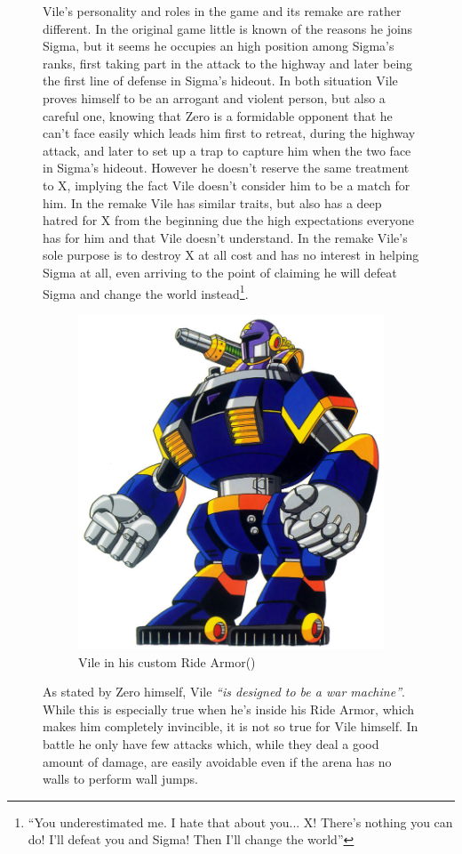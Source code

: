 \begin{figure}[htp]
Vile's personality and roles in the \x game and its remake are rather different. In the original game little is known of the reasons he joins Sigma, but it seems he occupies an high position among Sigma's ranks, first taking part in the attack to the highway and later being the first line of defense in Sigma's hideout. In both situation Vile proves himself to be an arrogant and violent person, but also a careful one, knowing that Zero is a formidable opponent that he can't face easily which leads him first to retreat, during the highway attack, and later to set up a trap to capture him when the two face in Sigma's hideout\cite{wiki:Vile}.  However he doesn't reserve the same treatment to X, implying the fact Vile doesn't consider him to be a match for him. In the remake Vile has similar traits, but also has a deep hatred for X from the beginning due the high expectations everyone has for him and that Vile doesn't understand. In the remake Vile's sole purpose is to destroy X at all cost and has no interest in helping Sigma at all, even arriving to the point of claiming he will defeat Sigma and change the world instead\footnote{\enquote{You underestimated me. I hate that about you... X! There's nothing you can do! I'll defeat you and Sigma! Then I'll change the world}\cite{wiki:MMX_script}}.
\begin{figure}[htp]
	\centering
	\includegraphics[width=0.35\linewidth]{figures/X1/Sigma_stages/VileRideArmor.jpg}
	\caption{Vile in his custom Ride Armor(\cite{book:MMX_Complete_art})}
\end{figure}
As stated by Zero himself, Vile \emph{``is designed to be a war machine''}. While this is especially true when he's inside his Ride Armor, which makes him completely invincible, it is not so true for Vile himself. In battle he only have few attacks which, while they deal a good amount of damage, are easily avoidable even if the arena has no walls to perform wall jumps.
\begin{figure}[htp]
	\centering
	\begin{subfigure}{\linewidth}

\end{subfigure}
\end{figure}
\end{figure}
